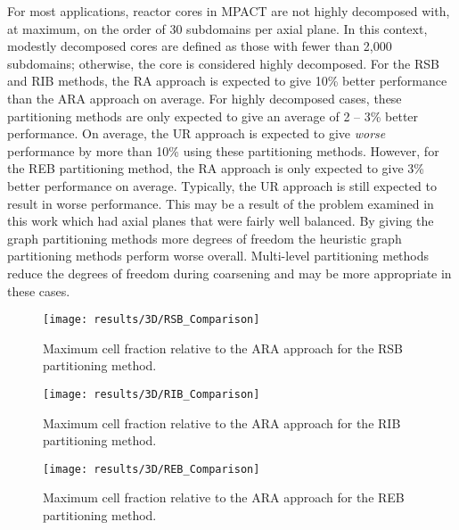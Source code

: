 {{{      For most applications, reactor cores in MPACT are not highly decomposed with, at maximum, on the order of 30 subdomains per axial plane.
      In this context, modestly decomposed cores are defined as those with fewer than 2,000 subdomains; otherwise, the core is considered highly decomposed.
      For the \ac{RSB} and \ac{RIB} methods, the \ac{RA} approach is expected to give 10\% better performance than the \ac{ARA} approach on average.
      For highly decomposed cases, these partitioning methods are only expected to give an average of 2 -- 3\% better performance.
      On average, the \ac{UR} approach is expected to give \emph{worse} performance by more than 10\% using these partitioning methods.
      However, for the \ac{REB} partitioning method, the \ac{RA} approach is only expected to give 3\% better performance on average.
      Typically, the \ac{UR} approach is still expected to result in worse performance.
      This may be a result of the problem examined in this work which had axial planes that were fairly well balanced.
      By giving the graph partitioning methods more degrees of freedom the heuristic graph partitioning methods perform worse overall.
      Multi-level partitioning methods reduce the degrees of freedom during coarsening and may be more appropriate in these cases.

      \begin{figure}
        \centering
        \texttt{[image: results/3D/RSB\_Comparison]}
        \caption{Maximum cell fraction relative to the \acf{ARA} approach for the \ac{RSB} partitioning method. \label{fig:Spatial Decomposition:RSB 3D Comparison}}
      \end{figure}
      \begin{figure}
        \centering
        \texttt{[image: results/3D/RIB\_Comparison]}
        \caption{Maximum cell fraction relative to the \acf{ARA} approach for the \ac{RIB} partitioning method. \label{fig:Spatial Decomposition:RIB 3D Comparison}}
      \end{figure}
      \begin{figure}
        \centering
        \texttt{[image: results/3D/REB\_Comparison]}
        \caption{Maximum cell fraction relative to the \acf{ARA} approach for the \ac{REB} partitioning method. \label{fig:Spatial Decomposition:REB 3D Comparison}}
      \end{figure}
    }
  }
}
